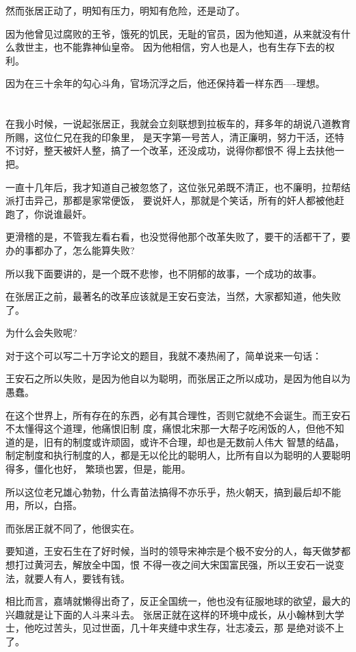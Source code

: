 \documentclass[11pt,a4paper,onecolumn]{article}
\begin{document}
然而张居正动了，明知有压力，明知有危险，还是动了。

因为他曾见过腐败的王爷，饿死的饥民，无耻的官员，因为他知道，从来就没有什么救世主，也不能靠神仙皇帝。
因为他相信，穷人也是人，也有生存下去的权利。

因为在三十余年的勾心斗角，官场沉浮之后，他还保持着一样东西----理想。

\section[\thesection]{}

在我小时候，一说起张居正，我就会立刻联想到拉板车的，拜多年的胡说八道教育所赐，这位仁兄在我的印象里，
是天字第一号苦人，清正廉明，努力干活，还特不讨好，整天被奸人整，搞了一个改革，还没成功，说得你都恨不
得上去扶他一把。

一直十几年后，我才知道自己被忽悠了，这位张兄弟既不清正，也不廉明，拉帮结派打击异己，那都是家常便饭，
要说奸人，那就是个笑话，所有的奸人都被他赶跑了，你说谁最奸。

更滑稽的是，不管我左看右看，也没觉得他那个改革失败了，要干的活都干了，要办的事都办了，怎么能算失败?

所以我下面要讲的，是一个既不悲惨，也不阴郁的故事，一个成功的故事。

在张居正之前，最著名的改革应该就是王安石变法，当然，大家都知道，他失败了。

为什么会失败呢?

对于这个可以写二十万字论文的题目，我就不凑热闹了，简单说来一句话：

王安石之所以失败，是因为他自以为聪明，而张居正之所以成功，是因为他自以为愚蠢。

在这个世界上，所有存在的东西，必有其合理性，否则它就绝不会诞生。而王安石不太懂得这个道理，他痛恨旧制
度，痛恨北宋那一大帮子吃闲饭的人，但他不知道的是，旧有的制度或许顽固，或许不合理，却也是无数前人伟大
智慧的结晶，制定制度和执行制度的人，都是无以伦比的聪明人，比所有自以为聪明的人要聪明得多，僵化也好，
繁琐也罢，但是，能用。

所以这位老兄雄心勃勃，什么青苗法搞得不亦乐乎，热火朝天，搞到最后却不能用，所以，白搭。

而张居正就不同了，他很实在。

要知道，王安石生在了好时候，当时的领导宋神宗是个极不安分的人，每天做梦都想打过黄河去，解放全中国，恨
不得一夜之间大宋国富民强，所以王安石一说变法，就要人有人，要钱有钱。

相比而言，嘉靖就懒得出奇了，反正全国统一，他也没有征服地球的欲望，最大的兴趣就是让下面的人斗来斗去。
张居正就在这样的环境中成长，从小翰林到大学士，他吃过苦头，见过世面，几十年夹缝中求生存，壮志凌云，那
是绝对谈不上了。
\end{document}
